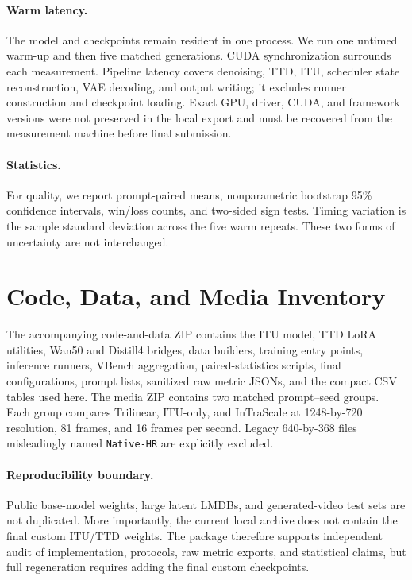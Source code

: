 \documentclass[letterpaper]{article}
\begin{document}
\paragraph{Warm latency.}
The model and checkpoints remain resident in one process.  We run one untimed
warm-up and then five matched generations.  CUDA synchronization surrounds
each measurement.  Pipeline latency covers denoising, TTD, ITU, scheduler
state reconstruction, VAE decoding, and output writing; it excludes runner
construction and checkpoint loading.  Exact GPU, driver, CUDA, and framework
versions were not preserved in the local export and must be recovered from the
measurement machine before final submission.

\paragraph{Statistics.}
For quality, we report prompt-paired means, nonparametric bootstrap 95\%
confidence intervals, win/loss counts, and two-sided sign tests.  Timing
variation is the sample standard deviation across the five warm repeats.
These two forms of uncertainty are not interchanged.

\section{Code, Data, and Media Inventory}

The accompanying code-and-data ZIP contains the ITU model, TTD LoRA utilities,
Wan50 and Distill4 bridges, data builders, training entry points, inference
runners, VBench aggregation, paired-statistics scripts, final configurations,
prompt lists, sanitized raw metric JSONs, and the compact CSV tables used here.
The media ZIP contains two matched prompt--seed groups.  Each group compares
Trilinear, ITU-only, and InTraScale at 1248-by-720 resolution, 81 frames, and
16 frames per second.  Legacy 640-by-368 files misleadingly named
\texttt{Native-HR} are explicitly excluded.

\paragraph{Reproducibility boundary.}
Public base-model weights, large latent LMDBs, and generated-video test sets are
not duplicated.  More importantly, the current local archive does not contain
the final custom ITU/TTD weights.  The package therefore supports independent
audit of implementation, protocols, raw metric exports, and statistical
claims, but full regeneration requires adding the final custom checkpoints.
\end{document}
